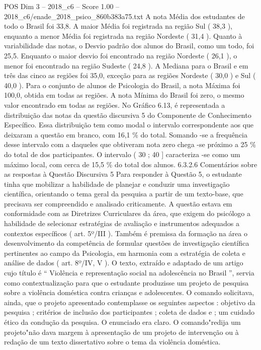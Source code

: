 \begin{textsample}{POS Dim 3 – 2018\_c6 – Score 1.00 – 2018\_c6/enade\_2018\_psico\_860b383a75.txt}
A nota Média dos estudantes de todo o Brasil foi 33,8.
A maior Média foi registrada na região Sul ( 38,3 ), enquanto a menor Média foi registrada na região Nordeste ( 31,4 ).
Quanto à variabilidade das notas, o Desvio padrão dos alunos do Brasil, como um todo, foi 25,5.
Enquanto o maior desvio foi encontrado na região Nordeste ( 26,1 ), o menor foi encontrado na região Sudeste ( 24,8 ).
A Mediana para o Brasil e em três das cinco as regiões foi 35,0, exceção para as regiões Nordeste ( 30,0 ) e Sul ( 40,0 ).
Para o conjunto de alunos de Psicologia do Brasil, a nota Máxima foi 100,0, obtida em todas as regiões.
A nota Mínima do Brasil foi zero, o mesmo valor encontrado em todas as regiões.
No Gráfico 6.13, é representada a distribuição das notas da questão discursiva 5 do Componente de Conhecimento Específico.
Essa distribuição tem como modal o intervalo correspondente aos que deixaram a questão em branco, com 16,1 \% do total.
Somando -se a frequência desse intervalo com a daqueles que obtiveram nota zero chega -se próximo a 25 \% do total de dos participantes.
O intervalo ( 30 ; 40 ] caracteriza -se como um máximo local, com cerca de 15,5 \% do total dos alunos. 6.3.2.6 Comentários sobre as respostas à Questão Discursiva 5 Para responder à Questão 5, o estudante tinha que mobilizar a habilidade de planejar e conduzir uma investigação científica, orientando o tema geral da pesquisa a partir de um texto-base, que precisava ser compreendido e analisado criticamente.
A questão estava em conformidade com as Diretrizes Curriculares da área, que exigem do psicólogo a habilidade de selecionar estratégias de avaliação e instrumentos adequados a contextos específicos ( art. 5º/III ).
Também é premissa da formação na área o desenvolvimento da competência de formular questões de investigação científica pertinentes ao campo da Psicologia, em harmonia com a estratégia de coleta e análise de dados ( art. 8º/IV, V ).
O texto, extraído e adaptado de um artigo cujo título é “ Violência e representação social na adolescência no Brasil ”, servia como contextualização para que o estudante produzisse um projeto de pesquisa sobre a violência doméstica contra crianças e adolescentes.
O comando solicitava, ainda, que o projeto apresentado contemplasse os seguintes aspectos : objetivo da pesquisa ; critérios de inclusão dos participantes ; coleta de dados e ; um cuidado ético da condução da pesquisa.
O enunciado era claro.
O comando"redija um projeto"não dava margem à apresentação de um projeto de intervenção ou à redação de um texto dissertativo sobre o tema da violência doméstica.

\end{textsample}
